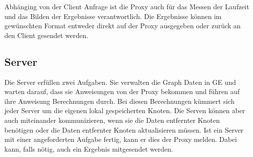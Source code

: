 Abhänging von der Client Anfrage ist die Proxy auch für das Messen der Laufzeit und das Bilden der Ergebnisse verantwortlich. Die Ergebnisse können im gewünschten Format entweder direkt auf der Proxy ausgegeben
oder zurück an den Client gesendet werden.

\subsection{Server}

Die Server erfüllen zwei Aufgaben. Sie verwalten die Graph Daten in GE und warten darauf, dass sie Anweisungen von der Proxy bekommen und führen auf ihre Anweisung Berechnungen durch. Bei diesen Berechnungen kümmert sich jeder Server 
um die eigenen lokal gespeicherten Knoten. Die Serven können aber auch miteinander kommunizieren, wenn sie die Daten entfernter Knoten benötigen oder die Daten entfernter Knoten
aktualisieren müssen.
Ist ein Server mit einer angeforderten Aufgabe fertig, kann er dies der Proxy melden. Dabei kann, falls nötig, auch ein Ergebnis mitgesendet werden.



